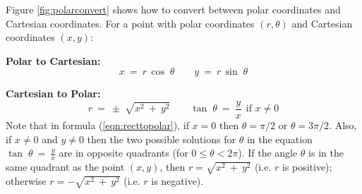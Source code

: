\divider
\newpage
\piccaption[]{\label{fig:polarconvert}}
Figure \ref{fig:polarconvert} shows how to convert between polar coordinates and Cartesian
coordinates. For a point with polar coordinates $(r,\theta)$ and Cartesian coordinates $(x,y)$:

\noindent\textbf{Polar to Cartesian:}
\begin{equation}\label{eqn:polartorect}
 \boxed{ x ~=~ r\,\cos\;\theta \qquad y ~=~ r\,\sin\;\theta }
\end{equation}

\noindent\textbf{Cartesian to Polar:}
\begin{equation}\label{eqn:recttopolar}
 \boxed{ r ~=~ \pm\;\sqrt{x^2 ~+~ y^2} \qquad \tan\;\theta ~=~ \frac{y}{x} ~~\text{if $x \ne 0$} }
\end{equation}\vspace{-2mm}
Note that in formula (\ref{eqn:recttopolar}), if $x = 0$ then $\theta = \pi/2$ or $\theta = 3\pi/2$.
Also, if $x \ne 0$ and $y \ne 0$ then the two possible solutions for $\theta$ in the equation
$\tan\;\theta ~=~ \frac{y}{x}$ are in opposite quadrants (for $0 \le \theta < 2\pi$). If the angle
$\theta$ is in the same quadrant as the point $(x,y)$, then $r = \sqrt{x^2 ~+~ y^2}$ (i.e. $r$ is
positive); otherwise $r = -\sqrt{x^2 ~+~ y^2}$ (i.e. $r$ is negative).

